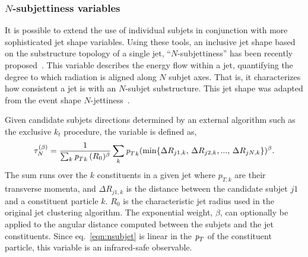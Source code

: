 

\subsubsection{$N$-subjettiness variables} 

It is possible to extend the use of individual subjets in conjunction with more sophisticated jet shape variables. Using these tools, an inclusive jet shape based on the substructure topology of a single jet, ``$N$-subjettiness'' has been recently proposed~\cite{nsubjettiness}. This variable describes the energy flow within a jet, quantifying the degree to which radiation is aligned along $N$ subjet axes. That is, it characterizes how consistent a jet is with an $N$-subjet substructure. This jet shape was adapted from the event shape $N$-jettiness~\cite{njetti}.

Given candidate subjets directions determined by an external algorithm such as the exclusive $k_t$ procedure, the variable is defined as,
%
\begin{equation} 
\tau^{(\beta)}_N = \frac{1}{\sum_k {{\emph{p}_{T}}}_k\,(R_0)^{\beta}} \sum_k {{\emph{p}_{T}}}_k (\min \{ \Delta R_{j1,k},\,\Delta R_{j2,k},...,\,\Delta R_{jN,k} \})^{\beta}.
\label{eqn:nsubjet}
\end{equation} 
%
The sum runs over the $k$ constituents in a given jet where $p_{T,k}$ are their transverse momenta, and $\Delta R_{j1,k}$ is the distance between the candidate subjet $j1$ and a constituent particle $k$.  $R_0$ is the characteristic jet radius used in the original jet clustering algorithm.  The exponential weight, $\beta$, can optionally be applied to the angular distance computed between the subjets and the jet constituents.   
Since eq.~\ref{eqn:nsubjet} is linear in the ${\emph{p}_{T}}$ of the constituent particle, this variable is an infrared-safe observable.


